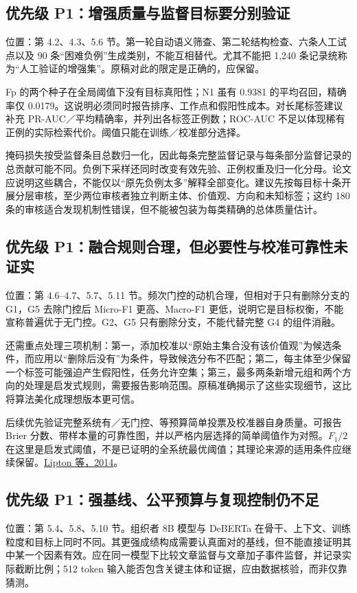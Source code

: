 \documentclass[12pt,a4paper]{article}
\begin{document}
\subsection{优先级 P1：增强质量与监督目标要分别验证}
位置：第 4.2、4.3、5.6 节。第一轮自动语义筛查、第二轮结构检查、六条人工试点以及 90 条“困难负例”生成类别，不能互相替代。尤其不能把 1,240 条记录统称为“人工验证的增强集”。原稿对此的限定是正确的，应保留。

Fp 的两个种子在全局阈值下没有目标真阳性；N1 虽有 0.9381 的平均召回，精确率仅 0.0179。这说明必须同时报告排序、工作点和假阳性成本。对长尾标签建议补充 PR-AUC／平均精确率，并列出各标签正例数；ROC-AUC 不足以体现稀有正例的实际检索代价。阈值只能在训练／校准部分选择。

掩码损失按受监督条目总数归一化，因此每条完整监督记录与每条部分监督记录的总贡献可能不同。负例下采样还同时改变有效先验、正例权重及归一化分母。论文应说明这些耦合，不能仅以“原先负例太多”解释全部变化。建议先按每目标十条开展分层审核，至少两位审核者独立判断主体、价值观、方向和未知标签；这约 180 条的审核适合发现机制性错误，但不能被包装为每类精确的总体质量估计。

\subsection{优先级 P1：融合规则合理，但必要性与校准可靠性未证实}
位置：第 4.6--4.7、5.7、5.11 节。频次门控的动机合理，但相对于只有删除分支的 G1，G5 去除门控后 Micro-F1 更高、Macro-F1 更低，说明它是目标权衡，不能宣称普遍优于无门控。G2、G5 只有删除分支，不能代替完整 G4 的组件消融。

还需重点处理三项机制：第一，添加校准以“原始主集合没有该价值观”为候选条件，而应用以“删除后没有”为条件，导致候选分布不匹配；第二，每主体至少保留一个标签可能强迫产生假阳性，任务允许空集；第三，最多两条新增元组和两个方向的处理是启发式规则，需要报告影响范围。原稿准确揭示了这些实现细节，这比将算法美化成理想版本更可信。

后续优先验证完整系统有／无门控、等预算简单投票及校准器自身质量。可报告 Brier 分数、带样本量的可靠性图，并以严格内层选择的简单阈值作为对照。$F_1/2$ 在这里是启发式阈值，不是已证明的全系统最优阈值；其理论来源的适用条件应继续保留。\href{https://arxiv.org/abs/1402.1892}{Lipton 等，2014}。

\subsection{优先级 P1：强基线、公平预算与复现控制仍不足}
位置：第 5.4、5.8、5.10 节。组织者 8B 模型与 DeBERTa 在骨干、上下文、训练粒度和目标上同时不同。其更强成绩构成需要认真面对的基线，但不能直接证明其中某一个因素有效。应在同一模型下比较文章监督与文章加子事件监督，并记录实际截断比例；512 token 输入能否包含关键主体和证据，应由数据核验，而非仅靠猜测。
\end{document}
